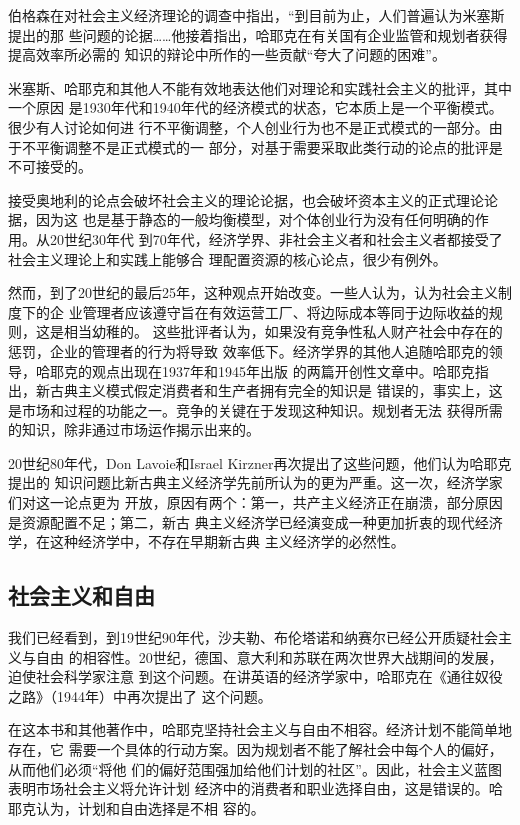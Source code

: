 伯格森在对社会主义经济理论的调查中指出，“到目前为止，人们普遍认为米塞斯提出的那
些问题的论据……他接着指出，哈耶克在有关国有企业监管和规划者获得提高效率所必需的
知识的辩论中所作的一些贡献“夸大了问题的困难”。

米塞斯、哈耶克和其他人不能有效地表达他们对理论和实践社会主义的批评，其中一个原因
是1930年代和1940年代的经济模式的状态，它本质上是一个平衡模式。很少有人讨论如何进
行不平衡调整，个人创业行为也不是正式模式的一部分。由于不平衡调整不是正式模式的一
部分，对基于需要采取此类行动的论点的批评是不可接受的。

接受奥地利的论点会破坏社会主义的理论论据，也会破坏资本主义的正式理论论据，因为这
也是基于静态的一般均衡模型，对个体创业行为没有任何明确的作用。从20世纪30年代
到70年代，经济学界、非社会主义者和社会主义者都接受了社会主义理论上和实践上能够合
理配置资源的核心论点，很少有例外。

然而，到了20世纪的最后25年，这种观点开始改变。一些人认为，认为社会主义制度下的企
业管理者应该遵守旨在有效运营工厂、将边际成本等同于边际收益的规则，这是相当幼稚的。
这些批评者认为，如果没有竞争性私人财产社会中存在的惩罚，企业的管理者的行为将导致
效率低下。经济学界的其他人追随哈耶克的领导，哈耶克的观点出现在1937年和1945年出版
的两篇开创性文章中。哈耶克指出，新古典主义模式假定消费者和生产者拥有完全的知识是
错误的，事实上，这是市场和过程的功能之一。竞争的关键在于发现这种知识。规划者无法
获得所需的知识，除非通过市场运作揭示出来的。

20世纪80年代，Don Lavoie和Israel Kirzner再次提出了这些问题，他们认为哈耶克提出的
知识问题比新古典主义经济学先前所认为的更为严重。这一次，经济学家们对这一论点更为
开放，原因有两个：第一，共产主义经济正在崩溃，部分原因是资源配置不足；第二，新古
典主义经济学已经演变成一种更加折衷的现代经济学，在这种经济学中，不存在早期新古典
主义经济学的必然性。

\clearpage
\subsection{社会主义和自由}

我们已经看到，到19世纪90年代，沙夫勒、布伦塔诺和纳赛尔已经公开质疑社会主义与自由
的相容性。20世纪，德国、意大利和苏联在两次世界大战期间的发展，迫使社会科学家注意
到这个问题。在讲英语的经济学家中，哈耶克在《通往奴役之路》（1944年）中再次提出了
这个问题。


在这本书和其他著作中，哈耶克坚持社会主义与自由不相容。经济计划不能简单地存在，它
需要一个具体的行动方案。因为规划者不能了解社会中每个人的偏好，从而他们必须“将他
们的偏好范围强加给他们计划的社区”。因此，社会主义蓝图表明市场社会主义将允许计划
经济中的消费者和职业选择自由，这是错误的。哈耶克认为，计划和自由选择是不相
容的。

